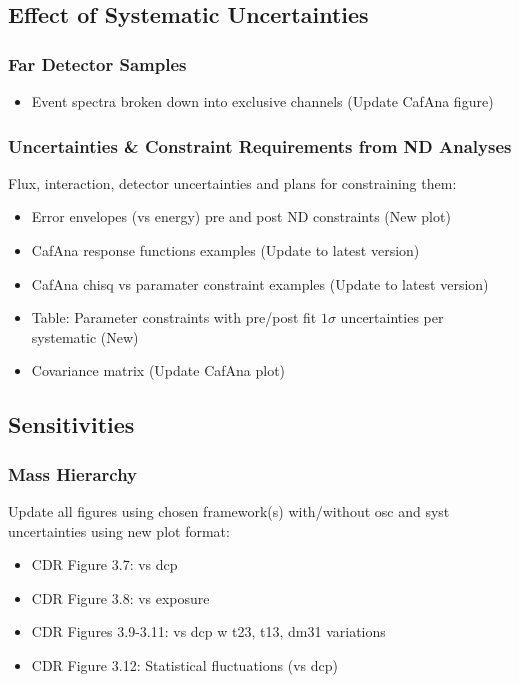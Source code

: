 \subsection{Effect of Systematic Uncertainties}
\subsubsection{Far Detector Samples}
\begin{itemize}
\item Event spectra broken down into exclusive channels (Update CafAna figure)
\end{itemize}
\subsubsection{Uncertainties \& Constraint Requirements from ND Analyses}
Flux, interaction, detector uncertainties and plans for constraining them:
\begin{itemize}
\item Error envelopes (vs energy) pre and post ND constraints (New plot)
\item CafAna response functions examples (Update to latest version)
\item CafAna chisq vs paramater constraint examples (Update to latest version)
\item Table: Parameter constraints with pre/post fit $1\sigma$ uncertainties per systematic (New)
\item Covariance matrix (Update CafAna plot)
\end{itemize}

\subsection{Sensitivities}
\subsubsection{Mass Hierarchy}
Update all figures using chosen framework(s) with/without osc and syst uncertainties using new plot format:
\begin{itemize}
\item CDR Figure 3.7: vs dcp
\item CDR Figure 3.8: vs exposure
\item CDR Figures 3.9-3.11: vs dcp w t23, t13, dm31 variations
\item CDR Figure 3.12: Statistical fluctuations (vs dcp)
\end{itemize}

